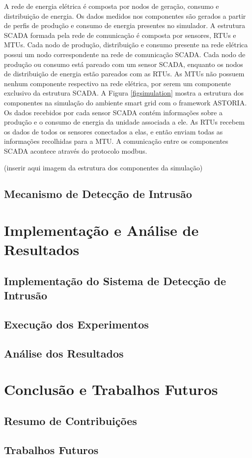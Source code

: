 \documentclass[cic,tc]{iiufrgs}
\begin{document}
A rede de energia elétrica é composta por nodos de geração, consumo e distribuição de energia. Os dados medidos nos componentes são gerados a partir de perfis de produção e consumo de energia presentes no simulador. A estrutura SCADA formada pela rede de comunicação é composta por sensores, RTUs e MTUs. Cada nodo de produção, distribuição e consumo presente na rede elétrica possui um nodo correspondente na rede de comunicação SCADA. Cada nodo de produção ou consumo está pareado com um sensor SCADA, enquanto os nodos de distribuição de energia estão pareados com as RTUs. As MTUs não possuem nenhum componente respectivo na rede elétrica, por serem um componente exclusivo da estrutura SCADA.
A Figura \ref{figsimulation} mostra a estrutura dos componentes na simulação do ambiente smart grid com o framework ASTORIA. Os dados recebidos por cada sensor SCADA contém informações sobre a produção e o consumo de energia da unidade associada a ele. As RTUs recebem os dados de todos os sensores conectados a elas, e então enviam todas as informações recolhidas para a MTU. A comunicação entre os componentes SCADA acontece através do protocolo modbus.

(inserir aqui imagem da estrutura dos componentes da simulação)
 
\section{Mecanismo de Detecção de Intrusão}
\chapter{Implementação e Análise de Resultados}
\section{Implementação do Sistema de Detecção de Intrusão}
\section{Execução dos Experimentos}
\section{Análise dos Resultados}
\chapter{Conclusão e Trabalhos Futuros}
\section{Resumo de Contribuições}
\section{Trabalhos Futuros}

% 



\end{document}
